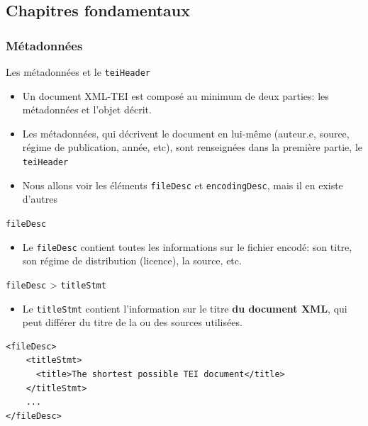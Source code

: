 \documentclass[11pt,aspectratio=1610]{beamer}
\begin{document}
\subsection{Chapitres fondamentaux}

\subsubsection{Métadonnées}

\begin{frame}{Les métadonnées et le \texttt{teiHeader}}
\begin{itemize}
\item Un document XML-TEI est composé au minimum de deux parties: les métadonnées et l'objet décrit.
\item Les métadonnées, qui décrivent le document en lui-même (auteur.e, source, régime de publication, année, etc), sont renseignées dans la première partie, le \texttt{teiHeader}
\item Nous allons voir les éléments \texttt{fileDesc} et \texttt{encodingDesc}, mais il en existe d'autres
\end{itemize}
\end{frame}


\begin{frame}{\texttt{fileDesc}}
\begin{itemize}
\item Le \texttt{fileDesc} contient toutes les informations sur le fichier encodé: son titre, 
son régime de distribution (licence), la source, etc. 
\end{itemize}
\end{frame}


\begin{frame}[containsverbatim]{\texttt{fileDesc} > \texttt{titleStmt}}
\begin{itemize}
\item Le \texttt{titleStmt} contient l'information sur le titre \textbf{du document XML}, qui peut différer du titre de la ou des sources utilisées.
\end{itemize}
\begin{verbatim}
<fileDesc>
    <titleStmt>
      <title>The shortest possible TEI document</title>
    </titleStmt>
    ...
</fileDesc>
\end{verbatim}
\end{frame}
\end{document}
